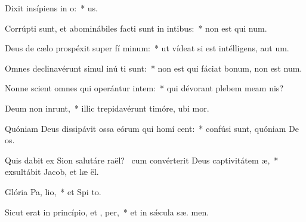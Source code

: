 \item Dixit insípiens in  o:~*   us.
\item Corrúpti sunt, et abominábiles facti sunt in intibus:~* non est qui  num.
\item Deus de cælo prospéxit super fí minum:~* ut vídeat si est intélligens, aut  um.
\item Omnes declinavérunt simul inú ti sunt:~* non est qui fáciat bonum, non est   num.
\item Nonne scient omnes qui operántur intem:~* qui dévorant plebem meam   nis?
\item Deum non inrunt,~* illic trepidavérunt timóre, ubi   mor.
\item Quóniam Deus dissipávit ossa eórum qui homí cent:~* confúsi sunt, quóniam De  os.
\item Quis dabit ex Sion salutáre raël?~\pscross{} cum convérterit Deus captivitátem  æ,~* exsultábit Jacob, et læ ël.
\item Glória Pa,  lio,~* et Spi to.
\item Sicut erat in princípio, et ,  per,~* et in sǽcula sæ. men.
